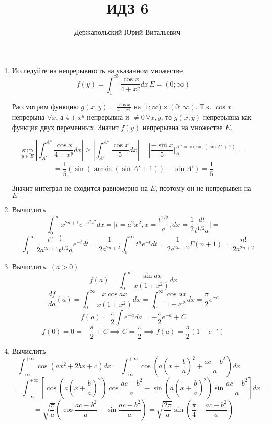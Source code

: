 \documentclass{article}
\title{ИДЗ 6}
\author{Держапольский Юрий Витальевич}
\date{}
\newcommand{\minf}{{-\infty}}
\newcommand{\pinf}{{+\infty}}
\begin{document}
\begin{large}
\maketitle

\begin{enumerate}

\item Исследуйте на непрерывность на указанном множестве.
$$ f(y) = \int_1^\infty \frac{\cos x}{4 +x^y} dx \, E = (0; \infty)$$

Рассмотрим функцию $ g(x,y) = \frac{\cos x}{4 +x^y} $ на $[1;\infty) \times (0; \infty)$. Т.к. $\cos x$ непрерына $\forall x$, а $4 + x^y$ непрерывна и $\neq 0\, \forall x, y$,
то $g(x,y)$ непрерывна как функция двух переменных.
Значит $f(y)$ непрерывна на множестве $E$.

$$ \sup_{y\in E} \left| \int_{A'}^{A''} \frac{\cos x}{4 +x^y} dx \right| \geq \left| \int_{A'}^{A''} \frac{\cos x}{5} dx \right| = \left| \frac{-\sin x}{5} \Big|_{A'}^{A''=\arcsin(\sin A' + 1)} \right| = $$
$$ = \frac{1}{5} \left( \sin (\arcsin(\sin A' + 1)) - \sin A' \right) = \frac{1}{5} $$

Значит интеграл не сходится равномерно на $E$, поэтому он не непрерывен на $E$

\item Вычислить
$$ \int_0^\infty x^{2n+1} e^{-a^2x^2} dx = \Big| t = a^2x^2, x = \frac{t^{1/2}}{a}, dx = \frac{1}{2}\frac{dt}{t^{1/2}a} \Big| = $$
$$ = \int_0^\infty \frac{t^{n+\frac{1}{2}}}{2a^{2n+1}t^{1/2}a} e^{-t} dt = \frac{1}{2a^{2n+2}} \int_0^\infty t^n e^{-t} dt = \frac{1}{2a^{2n+2}} \Gamma(n+1) = \frac{n!}{2a^{2n+2}} $$

\item Вычислить. $(a > 0)$
$$ f(a) = \int_0^\infty \frac{\sin ax}{x (1+x^2)} dx $$
$$ \frac{df}{da}(a) = \int_0^\infty \frac{x\cos ax }{x(1+x^2)}dx = \int_0^\infty \frac{\cos ax }{1+x^2} dx = \frac{\pi}{2}e^{-a}$$
$$ f(a) = \frac{\pi}{2} \int e^{-a} da = -\frac{\pi}{2} e^{-a} + C$$
$$ f(0) = 0 = -\frac{\pi}{2} + C \implies C = \frac{\pi}{2} \implies f(a) = \frac{\pi}{2}(1-e^{-a})$$

\item Вычислить
$$ \int_{-\infty}^{+\infty} \cos (ax^2 + 2bx + c) dx = \int_\minf^\pinf \cos \left( a \left( x + \frac{b}{a} \right)^2 + \frac{ac - b^2}{a} \right) dx = $$
$$ = \int_\minf^\pinf \left[ \cos \left( a \left( x + \frac{b}{a} \right)^2 \right) \cos \frac{ac-b^2}{a} - \sin \left( a \left( x + \frac{b}{a} \right)^2 \right) \sin \frac{ac-b^2}{a} \right] dx = $$
$$ = \sqrt{\frac{\pi}{a}} \left( \cos \frac{ac-b^2}{a} - \sin \frac{ac-b^2}{a} \right) = \sqrt{\frac{2\pi}{a}} \sin \left( \frac{\pi}{4} - \frac{ac-b^2}{a} \right) $$


\end{enumerate}
\end{large}
\end{document}

